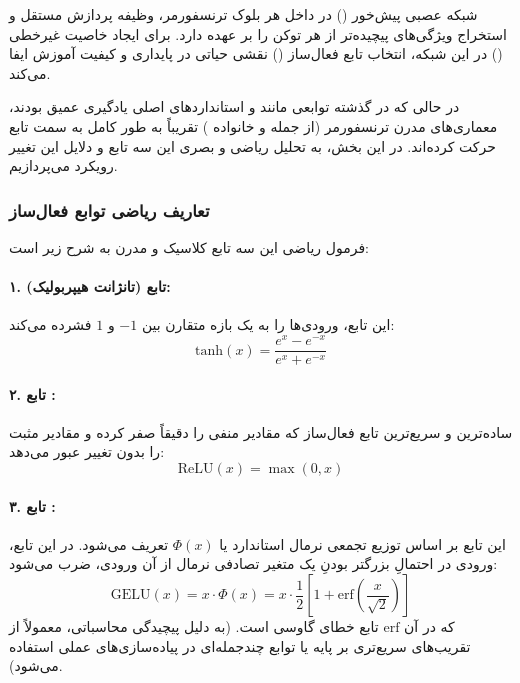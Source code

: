 \documentclass{article}
\begin{document}
شبکه عصبی پیش‌خور () در داخل هر بلوک ترنسفورمر، وظیفه پردازش مستقل و استخراج ویژگی‌های پیچیده‌تر از هر توکن را بر عهده دارد. برای ایجاد خاصیت غیرخطی () در این شبکه، انتخاب تابع فعال‌ساز () نقشی حیاتی در پایداری و کیفیت آموزش ایفا می‌کند. 

در حالی که در گذشته توابعی مانند  و  استانداردهای اصلی یادگیری عمیق بودند، معماری‌های مدرن ترنسفورمر (از جمله  و خانواده ) تقریباً به طور کامل به سمت تابع  حرکت کرده‌اند. در این بخش، به تحلیل ریاضی و بصری این سه تابع و دلایل این تغییر رویکرد می‌پردازیم.

\subsubsection*{تعاریف ریاضی توابع فعال‌ساز}

فرمول ریاضی این سه تابع کلاسیک و مدرن به شرح زیر است:

\paragraph{۱. تابع  (تانژانت هیپربولیک):}
این تابع، ورودی‌ها را به یک بازه متقارن بین $-1$ و $1$ فشرده می‌کند:
\begin{equation}
	\mathrm{tanh}(x) = \frac{e^x - e^{-x}}{e^x + e^{-x}}
\end{equation}

\paragraph{۲. تابع :}
ساده‌ترین و سریع‌ترین تابع فعال‌ساز که مقادیر منفی را دقیقاً صفر کرده و مقادیر مثبت را بدون تغییر عبور می‌دهد:
\begin{equation}
	\mathrm{ReLU}(x) = \max(0, x)
\end{equation}

\paragraph{۳. تابع :}
این تابع بر اساس توزیع تجمعی نرمال استاندارد یا $\Phi(x)$ تعریف می‌شود. در این تابع، ورودی در احتمالِ بزرگتر بودنِ یک متغیر تصادفی نرمال از آن ورودی، ضرب می‌شود:
\begin{equation}
	\mathrm{GELU}(x) = x \cdot \Phi(x) = x \cdot \frac{1}{2} \left[ 1 + \mathrm{erf}\left(\frac{x}{\sqrt{2}}\right) \right]
\end{equation}
که در آن $\mathrm{erf}$ تابع خطای گاوسی است. (به دلیل پیچیدگی محاسباتی، معمولاً از تقریب‌های سریع‌تری بر پایه  یا توابع چندجمله‌ای در پیاده‌سازی‌های عملی استفاده می‌شود).
\end{document}
